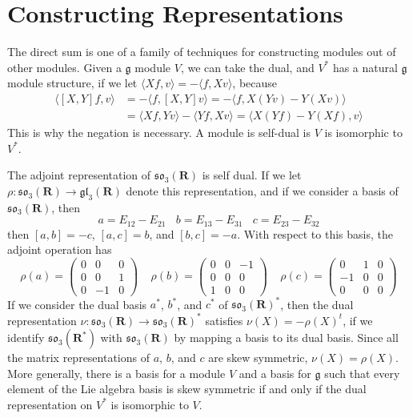 \section{Constructing Representations}

The direct sum is one of a family of techniques for constructing modules out of other modules. Given a $\mathfrak{g}$ module $V$, we can take the dual, and $V^*$ has a natural $\mathfrak{g}$ module structure, if we let $\langle Xf, v \rangle = - \langle f, Xv \rangle$, because
%
\begin{align*}
    \langle [X,Y]f, v \rangle &= - \langle f, [X,Y] v \rangle = - \langle f, X(Yv) - Y(Xv) \rangle\\
    &= \langle Xf, Yv \rangle - \langle Yf, Xv \rangle = \langle X(Yf) - Y(Xf), v \rangle
\end{align*}
%
This is why the negation is necessary. A module is self-dual is $V$ is isomorphic to $V^*$.

\begin{example}
    The adjoint representation of $\mathfrak{so}_3(\mathbf{R})$ is self dual. If we let $\rho: \mathfrak{so}_3(\mathbf{R}) \to \mathfrak{gl}_3(\mathbf{R})$ denote this representation, and if we consider a basis of $\mathfrak{so}_3(\mathbf{R})$, then
    \[ a = E_{12} - E_{21}\ \ \ \ b = E_{13} - E_{31}\ \ \ \ c = E_{23} - E_{32} \]
    then $[a,b] = -c$, $[a,c] = b$, and $[b,c] = -a$. With respect to this basis, the adjoint operation has
    \[ \rho(a) = \begin{pmatrix} 0 & 0 & 0 \\ 0 & 0 & 1 \\ 0 & -1 & 0 \end{pmatrix}\ \ \ \ \ \rho(b) = \begin{pmatrix} 0 & 0 & -1 \\ 0 & 0 & 0 \\ 1 & 0 & 0 \end{pmatrix}\ \ \ \ \ \rho(c) = \begin{pmatrix} 0 & 1 & 0 \\ -1 & 0 & 0 \\ 0 & 0 & 0 \end{pmatrix} \]
    If we consider the dual basis $a^*$, $b^*$, and $c^*$ of $\mathfrak{so}_3(\mathbf{R})^*$, then the dual representation $\nu: \mathfrak{so}_3(\mathbf{R}) \to \mathfrak{so}_3(\mathbf{R})^*$ satisfies $\nu (X) = - \rho(X)^t$, if we identify $\mathfrak{so}_3(\mathbf{R}^*)$ with $\mathfrak{so}_3(\mathbf{R})$ by mapping a basis to its dual basis. Since all the matrix representations of $a$, $b$, and $c$ are skew symmetric, $\nu(X) = \rho(X)$. More generally, there is a basis for a module $V$ and a basis for $\mathfrak{g}$ such that every element of the Lie algebra basis is skew symmetric if and only if the dual representation on $V^*$ is isomorphic to $V$.
\end{example}


